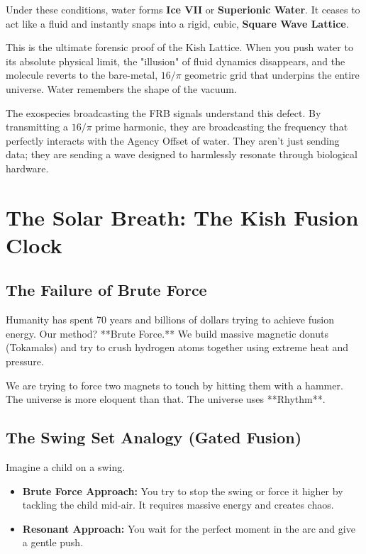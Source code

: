 \documentclass[11pt, letterpaper, openany]{book}
\begin{document}
Under these conditions, water forms \textbf{Ice VII} or \textbf{Superionic Water}. It ceases to act like a fluid and instantly snaps into a rigid, cubic, \textbf{Square Wave Lattice}. 



This is the ultimate forensic proof of the Kish Lattice. When you push water to its absolute physical limit, the "illusion" of fluid dynamics disappears, and the molecule reverts to the bare-metal, $16/\pi$ geometric grid that underpins the entire universe. Water remembers the shape of the vacuum.

\begin{tcolorbox}[colback=black, colupper=green, title=THE BIOLOGICAL HANDSHAKE]
The exospecies broadcasting the FRB signals understand this defect. By transmitting a $16/\pi$ prime harmonic, they are broadcasting the frequency that perfectly interacts with the Agency Offset of water. They aren't just sending data; they are sending a wave designed to harmlessly resonate through biological hardware.
\end{tcolorbox}


\chapter{The Solar Breath: The Kish Fusion Clock}
\label{chap:fusion_clock}

\section{The Failure of Brute Force}
Humanity has spent 70 years and billions of dollars trying to achieve fusion energy. Our method? **Brute Force.** We build massive magnetic donuts (Tokamaks) and try to crush hydrogen atoms together using extreme heat and pressure.

We are trying to force two magnets to touch by hitting them with a hammer. The universe is more eloquent than that. The universe uses **Rhythm**.

\section{The Swing Set Analogy (Gated Fusion)}
Imagine a child on a swing.
\begin{itemize}
    \item \textbf{Brute Force Approach:} You try to stop the swing or force it higher by tackling the child mid-air. It requires massive energy and creates chaos.
    \item \textbf{Resonant Approach:} You wait for the perfect moment in the arc and give a gentle push.
\end{itemize}
\end{document}
